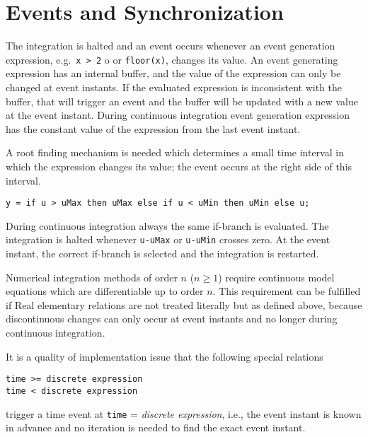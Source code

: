 \section{Events and Synchronization}

The integration is halted and an event occurs whenever an event
generation expression, e.g.\ \lstinline!x > 2! o or \lstinline!floor(x)!, changes
its value. An event generating expression has an internal buffer, and
the value of the expression can only be changed at event instants. If
the evaluated expression is inconsistent with the buffer, that will
trigger an event and the buffer will be updated with a new value at the
event instant. During continuous integration event generation expression
has the constant value of the expression from the last event instant.

\begin{nonnormative}
A root finding mechanism is needed which determines a small time interval in which the expression changes its value; the event occurs
at the right side of this interval.
\end{nonnormative}

\begin{example}
\begin{lstlisting}[language=modelica]
y = if u > uMax then uMax else if u < uMin then uMin else u;
\end{lstlisting}

During continuous integration always the same if-branch is
evaluated. The integration is halted whenever \lstinline!u-uMax! or \lstinline!u-uMin!
crosses zero. At the event instant, the correct if-branch is
selected and the integration is restarted.

Numerical integration methods of order $n$ ($n \geq 1$) require
continuous model equations which are differentiable up to order $n$. This
requirement can be fulfilled if Real elementary relations are not
treated literally but as defined above, because discontinuous changes
can only occur at event instants and no longer during continuous
integration.
\end{example}

\begin{nonnormative}
It is a quality of implementation issue that the following special relations
\begin{lstlisting}[language=modelica]
time >= discrete expression
time < discrete expression
\end{lstlisting}
trigger a time event at \lstinline!time! = \emph{discrete expression}, i.e., the
event instant is known in advance and no iteration is needed to find the
exact event instant.
\end{nonnormative}

